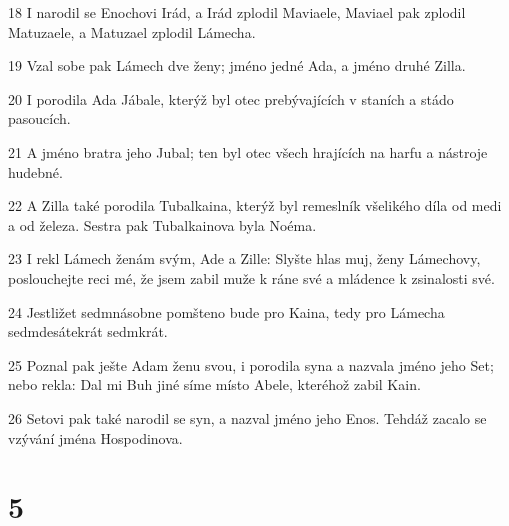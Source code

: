 \par 18 I narodil se Enochovi Irád, a Irád zplodil Maviaele, Maviael pak zplodil Matuzaele, a Matuzael zplodil Lámecha.
\par 19 Vzal sobe pak Lámech dve ženy; jméno jedné Ada, a jméno druhé Zilla.
\par 20 I porodila Ada Jábale, kterýž byl otec prebývajících v staních a stádo pasoucích.
\par 21 A jméno bratra jeho Jubal; ten byl otec všech hrajících na harfu a nástroje hudebné.
\par 22 A Zilla také porodila Tubalkaina, kterýž byl remeslník všelikého díla od medi a od železa. Sestra pak Tubalkainova byla Noéma.
\par 23 I rekl Lámech ženám svým, Ade a Zille: Slyšte hlas muj, ženy Lámechovy, poslouchejte reci mé, že jsem zabil muže k ráne své a mládence k zsinalosti své.
\par 24 Jestližet sedmnásobne pomšteno bude pro Kaina, tedy pro Lámecha sedmdesátekrát sedmkrát.
\par 25 Poznal pak ješte Adam ženu svou, i porodila syna a nazvala jméno jeho Set; nebo rekla: Dal mi Buh jiné síme místo Abele, kteréhož zabil Kain.
\par 26 Setovi pak také narodil se syn, a nazval jméno jeho Enos. Tehdáž zacalo se vzývání jména Hospodinova.

\chapter{5}

